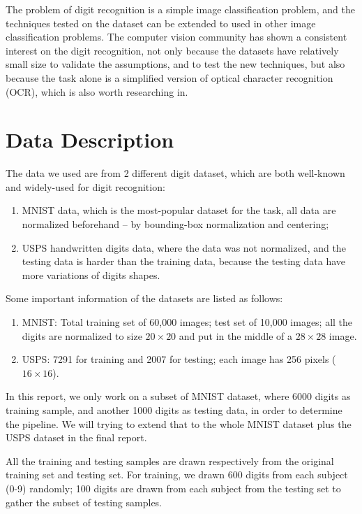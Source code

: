 \documentclass[12pt]{article}
\begin{document}
The problem of digit recognition is a simple image classification problem, and the techniques tested on the dataset can be extended to used in other image classification problems. The computer vision community has shown a consistent interest on the digit recognition, not only because the datasets have relatively small size to validate the assumptions, and to test the new techniques, but also because the task alone is a simplified version of optical character recognition (OCR), which is also worth researching in. 


\section{Data Description}
\label{sec:data}
The data we used are from 2 different digit dataset, which are both well-known and widely-used for digit recognition:\begin{enumerate}
\item MNIST data\cite{lecun1998gradient}, which is the most-popular dataset for the task, all data are normalized beforehand -- by bounding-box normalization and centering;
\item USPS handwritten digits data\cite{hull1994database}, where the data was not normalized, and the testing data is harder than the training data, because the testing data have more variations of digits shapes.
\end{enumerate}

Some important information of the datasets are listed as follows:
\begin{enumerate}
\item MNIST: Total training set of 60,000 images; test set of 10,000 images; all the digits are normalized to size $20 \times 20$ and put in the middle of a $28 \times 28$ image.
\item USPS: 7291 for training and 2007 for testing; each image has 256 pixels ($16 \times 16$).
\end{enumerate}

In this report, we only work on a subset of MNIST dataset, where 6000 digits as training sample, and another 1000 digits as testing data, in order to determine the pipeline. We will trying to extend that to the whole MNIST dataset plus the USPS dataset in the final report.

All the training and testing samples are drawn respectively from the original training set and testing set. For training, we drawn 600 digits from each subject (0-9) randomly; 100 digits are drawn from each subject from the testing set to gather the subset of testing samples.
\end{document}
